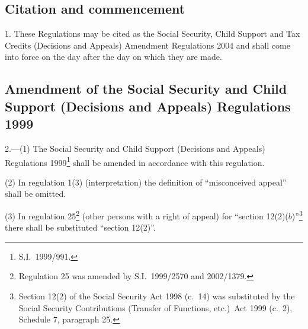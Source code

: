 \documentclass[12pt,a4paper]{article}
\begin{document}
{\sloppy

\tableofcontents

}

\bigskip

\setcounter{secnumdepth}{-2}

\subsection[1. Citation and commencement]{Citation and commencement}

1.  These Regulations may be cited as the Social Security, Child Support and Tax Credits (Decisions and Appeals) Amendment Regulations 2004 and shall come into force on the day after the day on which they are made.

\subsection[2. Amendment of the Social Security and Child Support (Decisions and Appeals) Regulations 1999]{Amendment of the Social Security and Child Support (Decisions and Appeals) Regulations 1999}

2.---(1)  The Social Security and Child Support (Decisions and Appeals) Regulations 1999\footnote{S.I.\ 1999/991.} shall be amended in accordance with this regulation.

(2) In regulation 1(3) (interpretation) the definition of “misconceived appeal” shall be omitted.

(3) In regulation 25\footnote{Regulation 25 was amended by S.I.\ 1999/2570 and 2002/1379.} (other persons with a right of appeal) for “section 12(2)($b$)”\footnote{Section 12(2) of the Social Security Act 1998 (c.\ 14) was substituted by the Social Security Contributions (Transfer of Functions, etc.)\ Act 1999 (c.\ 2), Schedule 7, paragraph 25.} there shall be substituted “section 12(2)”.
\end{document}
